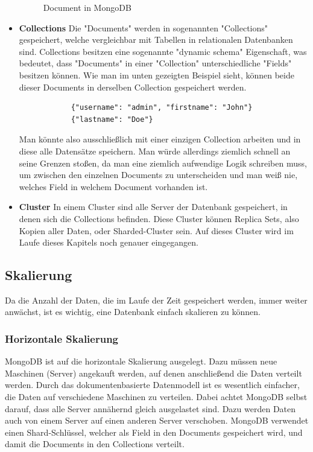 \begin{itemize}
\begin{figure}[h!]
            \caption{Document in MongoDB}
            \cite{mongodb_document}
            \label{fig:enter-label}
        \end{figure}
        \cite{mongodb_json_vs_bson}
    \item \textbf{Collections}
        \newline
        Die "Documents" werden in sogenannten "Collections" gespeichert, welche vergleichbar mit Tabellen in relationalen Datenbanken sind. Collections besitzen eine sogenannte "dynamic schema" Eigenschaft, was bedeutet, dass "Documents" in einer "Collection" unterschiedliche "Fields" besitzen können. Wie man im unten gezeigten Beispiel sieht, können beide dieser Documents in derselben Collection gespeichert werden.
        \begin{lstlisting}
            {"username": "admin", "firstname": "John"}
            {"lastname": "Doe"}
        \end{lstlisting}
        Man könnte also ausschließlich mit einer einzigen Collection arbeiten und in diese alle Datensätze speichern. Man würde allerdings ziemlich schnell an seine Grenzen stoßen, da man eine ziemlich aufwendige Logik schreiben muss, um zwischen den einzelnen Documents zu unterscheiden und man weiß nie, welches Field in welchem Document vorhanden ist.
    \item \textbf{Cluster}
        \newline
        In einem Cluster sind alle Server der Datenbank gespeichert, in denen sich die Collections befinden. Diese Cluster können Replica Sets, also Kopien aller Daten, oder Sharded-Cluster sein. Auf dieses Cluster wird im Laufe dieses Kapitels noch genauer eingegangen.
        \cite{mongodb_collections}
\end{itemize}

\subsection{Skalierung}
Da die Anzahl der Daten, die im Laufe der Zeit gespeichert werden, immer weiter anwächst, ist es wichtig, eine Datenbank einfach skalieren zu können. 

\subsubsection{Horizontale Skalierung}
MongoDB ist auf die horizontale Skalierung ausgelegt. Dazu müssen neue Maschinen (Server) angekauft werden, auf denen anschließend die Daten verteilt werden. Durch das dokumentenbasierte Datenmodell ist es wesentlich einfacher, die Daten auf verschiedene Maschinen zu verteilen. Dabei achtet MongoDB selbst darauf, dass alle Server annähernd gleich ausgelastet sind. Dazu werden Daten auch von einem Server auf einen anderen Server verschoben. MongoDB verwendet einen Shard-Schlüssel, welcher als Field in den Documents gespeichert wird, und damit die Documents in den Collections verteilt.
\cite{mongodb_collections}


